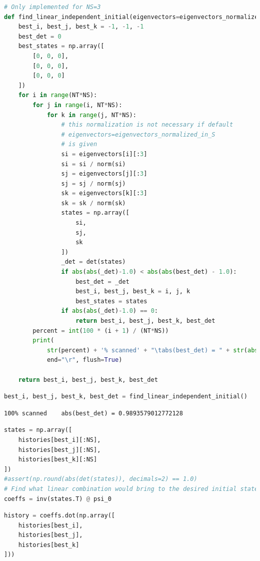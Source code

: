 \begin{lstlisting}[language=Python]
# Only implemented for NS=3
def find_linear_independent_initial(eigenvectors=eigenvectors_normalized_in_S):
    best_i, best_j, best_k = -1, -1, -1
    best_det = 0
    best_states = np.array([
        [0, 0, 0],
        [0, 0, 0],
        [0, 0, 0]
    ])
    for i in range(NT*NS):
        for j in range(i, NT*NS):
            for k in range(j, NT*NS):
                # this normalization is not necessary if default
                # eigenvectors=eigenvectors_normalized_in_S
                # is given
                si = eigenvectors[i][:3]
                si = si / norm(si)
                sj = eigenvectors[j][:3]
                sj = sj / norm(sj)
                sk = eigenvectors[k][:3]
                sk = sk / norm(sk)
                states = np.array([
                    si,
                    sj,
                    sk
                ])
                _det = det(states)
                if abs(abs(_det)-1.0) < abs(abs(best_det) - 1.0):
                    best_det = _det
                    best_i, best_j, best_k = i, j, k
                    best_states = states
                if abs(abs(_det)-1.0) == 0:
                    return best_i, best_j, best_k, best_det
        percent = int(100 * (i + 1) / (NT*NS))
        print(
            str(percent) + '% scanned' + "\tabs(best_det) = " + str(abs(best_det)),
            end="\r", flush=True)

    return best_i, best_j, best_k, best_det

\end{lstlisting}

\begin{lstlisting}[language=Python]
best_i, best_j, best_k, best_det = find_linear_independent_initial()
\end{lstlisting}

\begin{lstlisting}
100% scanned    abs(best_det) = 0.9893579012772128
\end{lstlisting}

\begin{lstlisting}[language=Python]
states = np.array([
    histories[best_i][:NS],
    histories[best_j][:NS],
    histories[best_k][:NS]
])
#assert(np.round(abs(det(states)), decimals=2) == 1.0)
# Find what linear combination would bring to the desired initial state psi_0_n
coeffs = inv(states.T) @ psi_0
\end{lstlisting}

\begin{lstlisting}[language=Python]
history = coeffs.dot(np.array([
    histories[best_i],
    histories[best_j],
    histories[best_k]
]))
\end{lstlisting}

